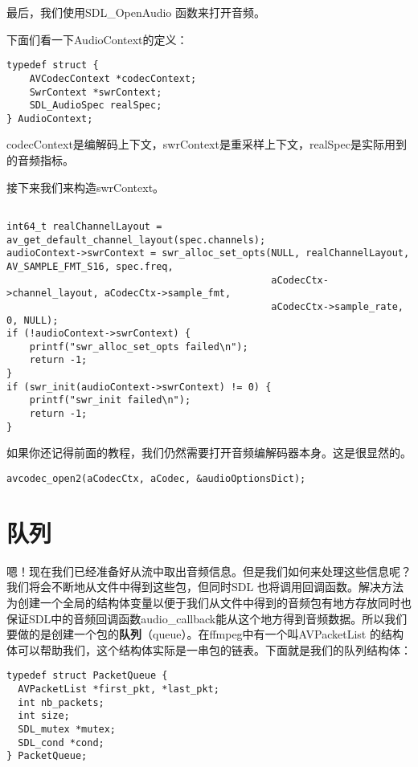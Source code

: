 最后，我们使用SDL_OpenAudio 函数来打开音频。

下面们看一下AudioContext的定义：

\begin{lstlisting}
typedef struct {
    AVCodecContext *codecContext;
    SwrContext *swrContext;
    SDL_AudioSpec realSpec;
} AudioContext;
\end{lstlisting}

codecContext是编解码上下文，swrContext是重采样上下文，realSpec是实际用到的音频指标。

接下来我们来构造swrContext。

\begin{lstlisting}

int64_t realChannelLayout = av_get_default_channel_layout(spec.channels);
audioContext->swrContext = swr_alloc_set_opts(NULL, realChannelLayout, AV_SAMPLE_FMT_S16, spec.freq,
                                              aCodecCtx->channel_layout, aCodecCtx->sample_fmt,
                                              aCodecCtx->sample_rate, 0, NULL);
if (!audioContext->swrContext) {
    printf("swr_alloc_set_opts failed\n");
    return -1;
}
if (swr_init(audioContext->swrContext) != 0) {
    printf("swr_init failed\n");
    return -1;
}
\end{lstlisting}

如果你还记得前面的教程，我们仍然需要打开音频编解码器本身。这是很显然的。

\begin{lstlisting}
avcodec_open2(aCodecCtx, aCodec, &audioOptionsDict);
\end{lstlisting}
\section{队列}

嗯！现在我们已经准备好从流中取出音频信息。但是我们如何来处理这些信息呢？我们将会不断地从文件中得到这些包，但同时SDL 也将调用回调函数。解决方法为创建一个全局的结构体变量以便于我们从文件中得到的音频包有地方存放同时也保证SDL中的音频回调函数audio_callback能从这个地方得到音频数据。所以我们要做的是创建一个包的\textbf{队列}（queue）。在ffmpeg中有一个叫AVPacketList 的结构体可以帮助我们，这个结构体实际是一串包的链表。下面就是我们的队列结构体：

\begin{lstlisting}
typedef struct PacketQueue {
  AVPacketList *first_pkt, *last_pkt;
  int nb_packets;
  int size;
  SDL_mutex *mutex;
  SDL_cond *cond;
} PacketQueue;
\end{lstlisting}

